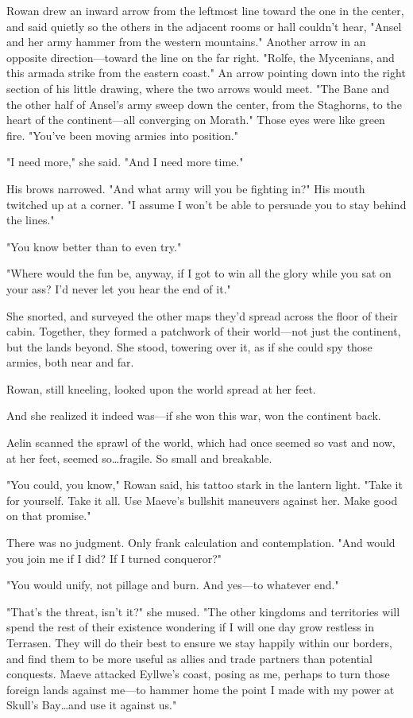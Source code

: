 Rowan drew an inward arrow from the leftmost line toward the one in the center, and said quietly so the others in the adjacent rooms or hall couldn't hear, "Ansel and her army hammer from the western mountains."
Another arrow in an opposite direction---toward the line on the far right.
"Rolfe, the Mycenians, and this armada strike from the eastern coast."
An arrow pointing down into the right section of his little drawing, where the two arrows would meet.
"The Bane and the other half of Ansel's army sweep down the center, from the Staghorns, to the heart of the continent---all converging on Morath."
Those eyes were like green fire.
"You've been moving armies into position."

"I need more," she said.
"And I need more time."

His brows narrowed.
"And what army will you be fighting in?"
His mouth twitched up at a corner.
"I assume I won't be able to persuade you to stay behind the lines."

"You know better than to even try."

"Where would the fun be, anyway, if I got to win all the glory while you sat on your ass?
I'd never let you hear the end of it."

She snorted, and surveyed the other maps they'd spread across the floor of their cabin.
Together, they formed a patchwork of their world---not just the continent, but the lands beyond.
She stood, towering over it, as if she could spy those armies, both near and far.

Rowan, still kneeling, looked upon the world spread at her feet.

And she realized it indeed was---if she won this war, won the continent back.

Aelin scanned the sprawl of the world, which had once seemed so vast and now, at her feet, seemed so\ldots fragile.
So small and breakable.

"You could, you know," Rowan said, his tattoo stark in the lantern light.
"Take it for yourself.
Take it all.
Use Maeve's bullshit maneuvers against her.
Make good on that promise."

There was no judgment.
Only frank calculation and contemplation.
"And would you join me if I did?
If I turned conqueror?"

"You would unify, not pillage and burn.
And yes---to whatever end."

"That's the threat, isn't it?"
she mused.
"The other kingdoms and territories will spend the rest of their existence wondering if I will one day grow restless in Terrasen.
They will do their best to ensure we stay happily within our borders, and find them to be more useful as allies and trade partners than potential conquests.
Maeve attacked Eyllwe's coast, posing as me, perhaps to turn those foreign lands against me---to hammer home the point I made with my power at Skull's Bay\ldots and use it against us."

